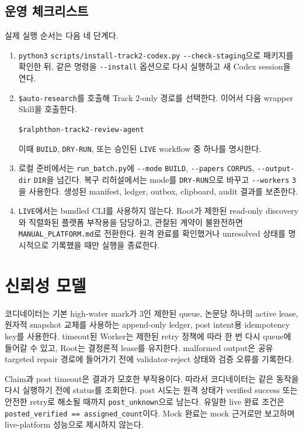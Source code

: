 \documentclass[11pt,a4paper]{article}
\begin{document}
\subsection{운영 체크리스트}

실제 실행 순서는 다음 네 단계다.
\begin{enumerate}
  \item \texttt{python3} \nolinkurl{scripts/install-track2-codex.py}
  \nolinkurl{--check-staging}으로 패키지를 확인한 뒤, 같은 명령을
  \nolinkurl{--install} 옵션으로 다시 실행하고 새 Codex session을 연다.
  \item \texttt{\$auto-research}를 호출해 Track 2-only 경로를 선택한다. 이어서
  다음 wrapper Skill을 호출한다.
  \begin{center}
    \texttt{\$ralphthon-track2-review-agent}
  \end{center}
  이때 \texttt{BUILD}, \texttt{DRY-RUN}, 또는 승인된 \texttt{LIVE} workflow
  중 하나를 명시한다.
  \item 로컬 준비에서는 \nolinkurl{run_batch.py}에 \nolinkurl{--mode}
  \texttt{BUILD}, \nolinkurl{--papers} \texttt{CORPUS},
  \nolinkurl{--output-dir} \texttt{DIR}을 넘긴다. 복구 리허설에서는 mode를
  \texttt{DRY-RUN}으로 바꾸고 \nolinkurl{--workers} \texttt{3}을 사용한다.
  생성된 manifest, ledger, outbox, clipboard, audit 결과를 보존한다.
  \item \texttt{LIVE}에서는 bundled CLI를 사용하지 않는다. Root가 제한된
  read-only discovery와 직렬화된 플랫폼 부작용을 담당하고, 관찰된 계약이
  불완전하면 \texttt{MANUAL\_PLATFORM.md}로 전환한다. 원격 완료를 확인했거나
  unresolved 상태를 명시적으로 기록했을 때만 실행을 종료한다.
\end{enumerate}

\section{신뢰성 모델}

코디네이터는 기본 high-water mark가 3인 제한된 queue, 논문당 하나의 active
lease, 원자적 snapshot 교체를 사용하는 append-only ledger, post intent용
idempotency key를 사용한다. timeout된 Worker는 제한된 retry 정책에 따라 한
번 다시 queue에 들어갈 수 있고, Root는 결정론적 lease를 유지한다. malformed
output은 공유 targeted repair 경로에 들어가기 전에 validator-reject 상태와
검증 오류를 기록한다.

Claim과 post timeout은 결과가 모호한 부작용이다. 따라서 코디네이터는 같은
동작을 다시 실행하기 전에 status를 조회한다. post 시도는 원격 상태가 verified
success 또는 안전한 retry로 해소될 때까지 \texttt{post\_unknown}으로 남는다.
유일한 live 완료 조건은 \texttt{posted\_verified == assigned\_count}이다.
Mock 완료는 mock 근거로만 보고하며 live-platform 성능으로 제시하지 않는다.
\end{document}
